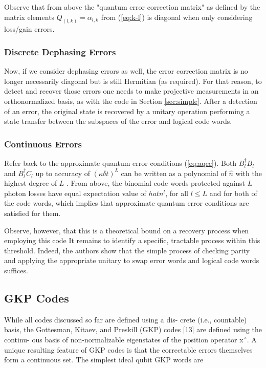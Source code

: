 \documentclass[12]{amsart}
\newcommand\0{\mathbf{0}}
\newcommand\<{\langle}
\renewcommand\>{\rangle}
\begin{document}
Observe that from above the "quantum error correction matrix" as defined by the matrix elements $Q_{(l, k)} = \alpha_{l, k}$ from (\ref{eq:k-l}) is diagonal when only considering loss/gain errors.

\subsubsection{Discrete Dephasing Errors}

Now, if we consider dephasing errors as well, the error correction matrix is no longer necessarily diagonal but is still Hermitian (as required). For that reason, to detect and recover those errors one needs to make projective measurements in an orthonormalized basis, as with the code in Section \ref{sec:simple}. After a detection of an error, the original state is recovered by a unitary operation performing a state transfer between the subspaces of the error and logical code words.

\subsubsection{Continuous Errors}

Refer back to the approximate quantum error conditions (\ref{eq:aqec}). Both $B_l^\dag B_l$ and $B_l^\dag C_l$ up to accuracy of $(\kappa \delta t)^L$ can be written as a polynomial of $\hat{n}$ with the highest degree of $L$ \cite{michael2016new}. From above, the binomial code words protected against $L$ photon losses have equal expectation value of $hat{n}^l$, for all $l \leq L$ and for both of the code words, which implies that approximate quantum error conditions are satisfied for them.

Observe, however, that this is a theoretical bound on a recovery process when employing this code It remains to identify a specific, tractable process within this threshold. Indeed, the authors show that the simple process of checking parity and applying the appropriate unitary to swap error words and logical code words suffices.
\subsection{GKP Codes}

While all codes discussed so far are defined using a dis- crete (i.e., countable) basis, the Gottesman, Kitaev, and Preskill (GKP) codes [13] are defined using the continu- ous basis of non-normalizable eigenstates of the position operator xˆ. A unique resulting feature of GKP codes is that the correctable errors themselves form a continuous set. The simplest ideal qubit GKP words are
\end{document}
